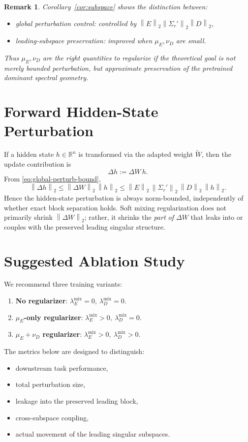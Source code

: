 \documentclass[11pt]{article}
\newtheorem{remark}{Remark}
\newcommand{\R}{\mathbb{R}}
\newcommand{\norm}[1]{\left\|#1\right\|}
\newcommand{\op}[1]{\left\|#1\right\|_2}
\begin{document}
\begin{remark}
Corollary~\ref{cor:subspace} shows the distinction between:
\begin{itemize}[leftmargin=2em]
    \item \emph{global perturbation control}: controlled by \(\op{E}\op{\Sigma_r'}\op{D}\),
    \item \emph{leading-subspace preservation}: improved when \(\mu_E,\nu_D\) are small.
\end{itemize}
Thus \(\mu_E,\nu_D\) are the right quantities to regularize if the theoretical goal is not merely bounded perturbation, but approximate preservation of the pretrained dominant spectral geometry.
\end{remark}

\section{Forward Hidden-State Perturbation}

If a hidden state \(h\in\R^n\) is transformed via the adapted weight \(\widetilde W\), then the update contribution is
\[
\Delta h := \Delta W\,h.
\]
From \eqref{eq:global-perturb-bound},
\[
\norm{\Delta h}_2
\le
\op{\Delta W}\,\norm{h}_2
\le
\op{E}\,\op{\Sigma_r'}\,\op{D}\,\norm{h}_2.
\]
Hence the hidden-state perturbation is always norm-bounded, independently of whether exact block separation holds. Soft mixing regularization does not primarily shrink \(\op{\Delta W}\); rather, it shrinks the \emph{part of \(\Delta W\)} that leaks into or couples with the preserved leading singular structure.

\section{Suggested Ablation Study}

We recommend three training variants:

\begin{enumerate}[leftmargin=2em]
    \item \textbf{No regularizer}: \(\lambda_E^{\mathrm{mix}}=0,\ \lambda_D^{\mathrm{mix}}=0\).
    \item \textbf{\(\mu_E\)-only regularizer}: \(\lambda_E^{\mathrm{mix}}>0,\ \lambda_D^{\mathrm{mix}}=0\).
    \item \textbf{\(\mu_E+\nu_D\) regularizer}: \(\lambda_E^{\mathrm{mix}}>0,\ \lambda_D^{\mathrm{mix}}>0\).
\end{enumerate}

The metrics below are designed to distinguish:
\begin{itemize}[leftmargin=2em]
    \item downstream task performance,
    \item total perturbation size,
    \item leakage into the preserved leading block,
    \item cross-subspace coupling,
    \item actual movement of the leading singular subspaces.
\end{itemize}
\end{document}
